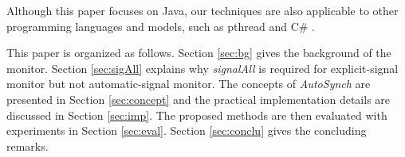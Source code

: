 \documentclass[preprint]{sigplanconf}
\begin{document}


Although this paper 
focuses on Java, our techniques are also applicable to other programming 
languages and models, such as pthread and C\# \cite{hwg03}.


This paper is organized as follows. Section \ref{sec:bg} gives the background
of the monitor. 
Section \ref{sec:sigAll} explains why {\em signalAll} is required for
explicit-signal monitor but not automatic-signal monitor. The concepts of 
{\em AutoSynch} are presented in Section \ref{sec:concept} and the practical 
implementation details are discussed in Section  \ref{sec:imp}. The proposed 
methods are then evaluated with experiments in Section \ref{sec:eval}.  
Section \ref{sec:conclu} gives the concluding remarks.
\end{document}
